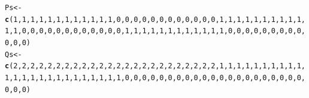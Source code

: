 \documentclass{article}\usepackage[]{graphicx}\usepackage[]{color}
\makeatletter
\newcommand{\hlnum}[1]{\textcolor[rgb]{0.686,0.059,0.569}{#1}}%
\newcommand{\hlstd}[1]{\textcolor[rgb]{0.345,0.345,0.345}{#1}}%
\newcommand{\hlkwb}[1]{\textcolor[rgb]{0.69,0.353,0.396}{#1}}%
\newcommand{\hlkwd}[1]{\textcolor[rgb]{0.737,0.353,0.396}{\textbf{#1}}}%
\newenvironment{kframe}{%
 \def\at@end@of@kframe{}%
 \ifinner\ifhmode%
  \def\at@end@of@kframe{\end{minipage}}%
  \begin{minipage}{\columnwidth}%
 \fi\fi%
 \def\FrameCommand##1{\hskip\@totalleftmargin \hskip-\fboxsep
 \colorbox{shadecolor}{##1}\hskip-\fboxsep
     \hskip-\linewidth \hskip-\@totalleftmargin \hskip\columnwidth}%
 \MakeFramed {\advance\hsize-\width
   \@totalleftmargin\z@ \linewidth\hsize
   \@setminipage}}%
 {\par\unskip\endMakeFramed%
 \at@end@of@kframe}
\newenvironment{knitrout}{}{} %
\makeatother
\begin{document}
\begin{knitrout}
\begin{kframe}
\begin{alltt}
\hlstd{Ps} \hlkwb{<-} \hlkwd{c}\hlstd{(}\hlnum{1}\hlstd{,}\hlnum{1}\hlstd{,}\hlnum{1}\hlstd{,}\hlnum{1}\hlstd{,}\hlnum{1}\hlstd{,}\hlnum{1}\hlstd{,}\hlnum{1}\hlstd{,}\hlnum{1}\hlstd{,}\hlnum{1}\hlstd{,}\hlnum{1}\hlstd{,}\hlnum{1}\hlstd{,}\hlnum{1}\hlstd{,}\hlnum{0}\hlstd{,}\hlnum{0}\hlstd{,}\hlnum{0}\hlstd{,}\hlnum{0}\hlstd{,}\hlnum{0}\hlstd{,}\hlnum{0}\hlstd{,}\hlnum{0}\hlstd{,}\hlnum{0}\hlstd{,}\hlnum{0}\hlstd{,}\hlnum{0}\hlstd{,}\hlnum{0}\hlstd{,}\hlnum{0}\hlstd{,}\hlnum{1}\hlstd{,}\hlnum{1}\hlstd{,}\hlnum{1}\hlstd{,}\hlnum{1}\hlstd{,}\hlnum{1}\hlstd{,}\hlnum{1}\hlstd{,}\hlnum{1}\hlstd{,}\hlnum{1}\hlstd{,}\hlnum{1}\hlstd{,}\hlnum{1}\hlstd{,}\hlnum{1}\hlstd{,}\hlnum{1}\hlstd{,}\hlnum{0}\hlstd{,}\hlnum{0}\hlstd{,}\hlnum{0}\hlstd{,}\hlnum{0}\hlstd{,}\hlnum{0}\hlstd{,}\hlnum{0}\hlstd{,}\hlnum{0}\hlstd{,}\hlnum{0}\hlstd{,}\hlnum{0}\hlstd{,}\hlnum{0}\hlstd{,}\hlnum{0}\hlstd{,}\hlnum{0}\hlstd{,}\hlnum{1}\hlstd{,}\hlnum{1}\hlstd{,}\hlnum{1}\hlstd{,}\hlnum{1}\hlstd{,}\hlnum{1}\hlstd{,}\hlnum{1}\hlstd{,}\hlnum{1}\hlstd{,}\hlnum{1}\hlstd{,}\hlnum{1}\hlstd{,}\hlnum{1}\hlstd{,}\hlnum{1}\hlstd{,}\hlnum{1}\hlstd{,}\hlnum{0}\hlstd{,}\hlnum{0}\hlstd{,}\hlnum{0}\hlstd{,}\hlnum{0}\hlstd{,}\hlnum{0}\hlstd{,}\hlnum{0}\hlstd{,}\hlnum{0}\hlstd{,}\hlnum{0}\hlstd{,}\hlnum{0}\hlstd{,}\hlnum{0}\hlstd{,}\hlnum{0}\hlstd{,}\hlnum{0}\hlstd{)}
\hlstd{Qs} \hlkwb{<-} \hlkwd{c}\hlstd{(}\hlnum{2}\hlstd{,}\hlnum{2}\hlstd{,}\hlnum{2}\hlstd{,}\hlnum{2}\hlstd{,}\hlnum{2}\hlstd{,}\hlnum{2}\hlstd{,}\hlnum{2}\hlstd{,}\hlnum{2}\hlstd{,}\hlnum{2}\hlstd{,}\hlnum{2}\hlstd{,}\hlnum{2}\hlstd{,}\hlnum{2}\hlstd{,}\hlnum{2}\hlstd{,}\hlnum{2}\hlstd{,}\hlnum{2}\hlstd{,}\hlnum{2}\hlstd{,}\hlnum{2}\hlstd{,}\hlnum{2}\hlstd{,}\hlnum{2}\hlstd{,}\hlnum{2}\hlstd{,}\hlnum{2}\hlstd{,}\hlnum{2}\hlstd{,}\hlnum{2}\hlstd{,}\hlnum{2}\hlstd{,}\hlnum{1}\hlstd{,}\hlnum{1}\hlstd{,}\hlnum{1}\hlstd{,}\hlnum{1}\hlstd{,}\hlnum{1}\hlstd{,}\hlnum{1}\hlstd{,}\hlnum{1}\hlstd{,}\hlnum{1}\hlstd{,}\hlnum{1}\hlstd{,}\hlnum{1}\hlstd{,}\hlnum{1}\hlstd{,}\hlnum{1}\hlstd{,}\hlnum{1}\hlstd{,}\hlnum{1}\hlstd{,}\hlnum{1}\hlstd{,}\hlnum{1}\hlstd{,}\hlnum{1}\hlstd{,}\hlnum{1}\hlstd{,}\hlnum{1}\hlstd{,}\hlnum{1}\hlstd{,}\hlnum{1}\hlstd{,}\hlnum{1}\hlstd{,}\hlnum{1}\hlstd{,}\hlnum{1}\hlstd{,}\hlnum{0}\hlstd{,}\hlnum{0}\hlstd{,}\hlnum{0}\hlstd{,}\hlnum{0}\hlstd{,}\hlnum{0}\hlstd{,}\hlnum{0}\hlstd{,}\hlnum{0}\hlstd{,}\hlnum{0}\hlstd{,}\hlnum{0}\hlstd{,}\hlnum{0}\hlstd{,}\hlnum{0}\hlstd{,}\hlnum{0}\hlstd{,}\hlnum{0}\hlstd{,}\hlnum{0}\hlstd{,}\hlnum{0}\hlstd{,}\hlnum{0}\hlstd{,}\hlnum{0}\hlstd{,}\hlnum{0}\hlstd{,}\hlnum{0}\hlstd{,}\hlnum{0}\hlstd{,}\hlnum{0}\hlstd{,}\hlnum{0}\hlstd{,}\hlnum{0}\hlstd{,}\hlnum{0}\hlstd{)}
\end{alltt}
\end{kframe}
\end{knitrout}
\end{document}

